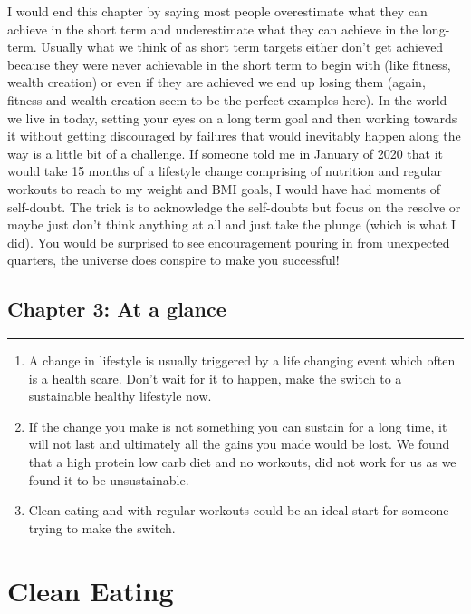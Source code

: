 \documentclass[
  oneside]{book}
\begin{document}
I would end this chapter by saying most people overestimate what they can achieve in the short term and underestimate what they can achieve in the long-term. Usually what we think of as short term targets either don't get achieved because they were never achievable in the short term to begin with (like fitness, wealth creation) or even if they are achieved we end up losing them (again, fitness and wealth creation seem to be the perfect examples here). In the world we live in today, setting your eyes on a long term goal and then working towards it without getting discouraged by failures that would inevitably happen along the way is a little bit of a challenge. If someone told me in January of 2020 that it would take 15 months of a lifestyle change comprising of nutrition and regular workouts to reach to my weight and BMI goals, I would have had moments of self-doubt. The trick is to acknowledge the self-doubts but focus on the resolve or maybe just don't think anything at all and just take the plunge (which is what I did). You would be surprised to see encouragement pouring in from unexpected quarters, the universe does conspire to make you successful!

\hypertarget{chapter-3-at-a-glance}{%
\section{Chapter 3: At a glance}\label{chapter-3-at-a-glance}}

\begin{center}\rule{0.5\linewidth}{0.5pt}\end{center}

\begin{enumerate}
\def\labelenumi{\arabic{enumi}.}
\item
  A change in lifestyle is usually triggered by a life changing event which often is a health scare. Don't wait for it to happen, make the switch to a sustainable healthy lifestyle now.
\item
  If the change you make is not something you can sustain for a long time, it will not last and ultimately all the gains you made would be lost. We found that a high protein low carb diet and no workouts, did not work for us as we found it to be unsustainable.
\item
  Clean eating and with regular workouts could be an ideal start for someone trying to make the switch.
\end{enumerate}

\hypertarget{clean-eating}{%
\chapter{Clean Eating}\label{clean-eating}}
\end{document}
